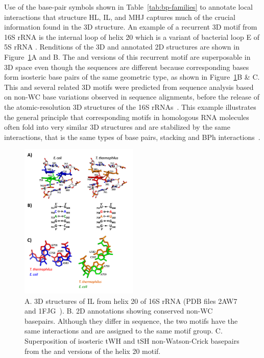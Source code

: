 Use of the base-pair symbols shown in Table~\ref{tab:bp-families} to annotate local interactions
that structure HL, IL, and MHJ captures much of the crucial information found in
the 3D structure. An example of a recurrent 3D motif from 16S rRNA is the
internal loop of helix 20 which is a variant of bacterial loop E of 5S rRNA
\cite{Leontis1998a}. Renditions of the 3D and annotated 2D structures are shown
in Figure~\ref{fig:compare-il}A and B. The \EC{} and \TT{} versions of this
recurrent motif are superposable in 3D space even though the sequences are
different because corresponding bases form isosteric base pairs of the same
geometric type, as shown in Figure~\ref{fig:compare-il}B \& C. This and several
related 3D motifs were predicted from sequence analysis based on non-WC base
variations observed in sequence alignments, before the release of the
atomic-resolution 3D structures of the 16S rRNAs~\cite{Leontis1998,
Leontis2002e}. This example illustrates the general principle that corresponding
motifs in homologous RNA molecules often fold into very similar 3D structures
and are stabilized by the same interactions, that is the same types of base
pairs, stacking and BPh interactions~\cite{Petrov2013}.

\begin{figure}
  \includegraphics[width=0.5\textwidth]{chapter-1/figs/IL-20}
        \caption{A. 3D structures of IL from helix 20 of 16S rRNA (PDB files
        2AW7~\cite{Schuwirth2005} and 1FJG~\cite{Carter2000}). B. 2D annotations
        showing conserved non-WC basepairs. Although they differ in sequence,
        the two motifs have the same interactions
    and are assigned to the same motif group. C. Superposition of isosteric tWH
    and tSH non-Watson-Crick basepairs from the \EC{} and \TT{} versions of the
    helix 20 motif.}
\label{fig:compare-il}
\end{figure}

